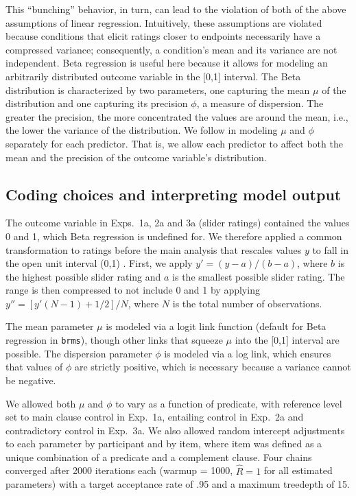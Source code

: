 \documentclass[11pt,fleqn]{article}
\newcommand{\6}{\mbox{$[\hspace*{-.6mm}[$}}
\newcommand{\9}{\mbox{$]\hspace*{-.6mm}]$}}
\begin{document}
This ``bunching'' behavior, in turn, can lead to the violation of both of the above assumptions of linear regression. 
Intuitively, these assumptions are violated because conditions that elicit ratings closer to endpoints necessarily have a compressed variance; consequently, a condition's mean and its variance are not independent. Beta regression is useful here because it allows for modeling an arbitrarily distributed outcome variable in the $[$0,1$]$ interval. The Beta distribution is characterized by two parameters, one capturing the mean $\mu$ of the distribution and one capturing its precision $\phi$, a measure of dispersion. The greater the precision, the more concentrated the values are around the mean, i.e., the lower the variance of the distribution.  We follow \citet{smithson2006} in modeling $\mu$ and $\phi$ separately for each predictor. That is, we allow each predictor to affect both the mean and the precision of the outcome variable's distribution. 

\subsection{Coding choices and interpreting model output}\label{a-primer}

The outcome variable in Exps.~1a, 2a and 3a (slider ratings) contained the values 0 and 1, which Beta regression is undefined for. We therefore applied a common transformation to ratings before the main analysis that rescales values $y$ to fall in the open unit interval (0,1)  \citep{smithson2006}. First, we apply $y' = (y-a)/(b-a)$, where $b$ is the highest possible slider rating and $a$ is the smallest possible slider rating. The range is then compressed to not include 0 and 1 by applying $y'' = [y'(N-1) + 1/2]/N$, where $N$ is the total number of observations.

The mean parameter $\mu$ is modeled via a logit link function (default for Beta regression in \verb|brms|), though other links that squeeze $\mu$ into the $[$0,1$]$ interval are possible. The dispersion parameter $\phi$ is modeled via a log link, which ensures that values of $\phi$ are strictly positive, which is necessary because a variance cannot be negative. 

We allowed both $\mu$ and $\phi$ to vary as a function of predicate, with reference level set to main clause control in Exp.~1a, entailing control in Exp.~2a and contradictory control in Exp.~3a. We also allowed random intercept adjustments to each parameter by participant and by item, where item was defined as a unique combination of a predicate and a complement clause. Four chains converged after 2000 iterations each (warmup = 1000, \(\hat{R}=1\) for all estimated parameters) with a target acceptance rate of .95 and a maximum treedepth of 15.
\end{document}

